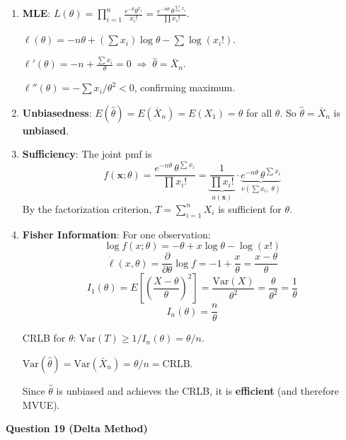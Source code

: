 \documentclass[11pt]{article}
\begin{document}
\begin{enumerate}[label=(\alph*)]
\item \textbf{MLE}: $L(\theta) = \prod_{i=1}^n \frac{e^{-\theta}\theta^{x_i}}{x_i!} = \frac{e^{-n\theta}\,\theta^{\sum x_i}}{\prod x_i!}$.

$\ell(\theta) = -n\theta + \left(\sum x_i\right)\log\theta - \sum\log(x_i!)$.

$\ell'(\theta) = -n + \frac{\sum x_i}{\theta} = 0 \;\Longrightarrow\; \boxed{\hat\theta = \bar X_n}$.

$\ell''(\theta) = -\sum x_i/\theta^2 < 0$, confirming maximum.

\item \textbf{Unbiasedness}: $E(\hat\theta) = E(\bar X_n) = E(X_1) = \theta$ for all $\theta$. So $\hat\theta = \bar X_n$ is \textbf{unbiased}.

\item \textbf{Sufficiency}: The joint pmf is
$$f(\mathbf{x};\theta) = \frac{e^{-n\theta}\,\theta^{\sum x_i}}{\prod x_i!} = \underbrace{\frac{1}{\prod x_i!}}_{u(\mathbf{x})} \cdot \underbrace{e^{-n\theta}\,\theta^{\sum x_i}}_{v(\sum x_i,\;\theta)}$$
By the factorization criterion, $T = \sum_{i=1}^n X_i$ is sufficient for $\theta$.

\item \textbf{Fisher Information}: For one observation:
$$\log f(x;\theta) = -\theta + x\log\theta - \log(x!)$$
$$\dot\ell(x,\theta) = \frac{\partial}{\partial\theta}\log f = -1 + \frac{x}{\theta} = \frac{x - \theta}{\theta}$$
$$I_1(\theta) = E\!\left[\left(\frac{X-\theta}{\theta}\right)^2\right] = \frac{\text{Var}(X)}{\theta^2} = \frac{\theta}{\theta^2} = \frac{1}{\theta}$$
$$I_n(\theta) = \frac{n}{\theta}$$

CRLB for $\theta$: $\text{Var}(T) \ge 1/I_n(\theta) = \theta/n$.

$\text{Var}(\hat\theta) = \text{Var}(\bar X_n) = \theta/n = \text{CRLB}$.

Since $\hat\theta$ is unbiased and achieves the CRLB, it is \textbf{efficient} (and therefore MVUE).
\end{enumerate}

\bigskip

\textbf{Question 19 (Delta Method)}
\end{document}
